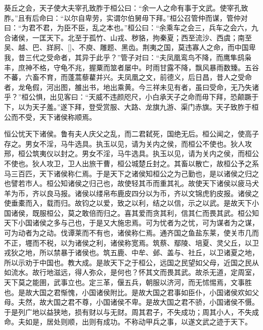 \documentclass[]{article}
\begin{document}
葵丘之会，天子使大夫宰孔致胙于桓公曰：``余一人之命有事于文武。使宰孔致胙。''且有后命曰：``以尔自卑劳，实谓尔伯舅毋下拜。''桓公召管仲而谋，管仲对曰：``为君不君，为臣不臣，乱之本也。''桓公曰：``余乘车之会三，兵车之会六，九合诸侯，一匡天下。北至于孤竹、山戎、秽貉，拘秦夏；西至流沙、西虞；南至吴、越、巴、牂牁、{[}{]}、不庾、雕题、黑齿。荆夷之国，莫违寡人之命，而中国卑我，昔三代之受命者，其异于此乎？''管子对曰：``夫凤凰鸾鸟不降，而鹰隼鸱枭丰，庶神不格，守龟不兆，握粟而筮者屡中。时雨甘露不降，飘风暴雨数臻。五谷不蕃，六畜不育，而蓬蒿藜藋并兴。夫凤凰之文，前德义，后日昌，昔人之受命者，龙龟假，河出图，雒出书，地出乘黄。今三祥未见有者，虽曰受命，无乃失诸乎？''桓公惧，出见客曰：``天威不违颜咫尺，小白承天子之命而毋下拜，恐颠蹶于下，以为天子羞。''遂下拜，登受赏服、大路、龙旗九游、渠门赤旗。天子致胙于桓公而不受，天下诸侯称顺焉。

恒公忧天下诸侯。鲁有夫人庆父之乱，而二君弑死，国绝无后。桓公闻之，使高子存之。男女不淫，马牛选具。执玉以见，请为关内之侯，而桓公不使也。狄人攻邢，桓公筑夷仪以封之。男女不淫，马牛选具。执玉以见，请为关内之侯，而桓公不使也。狄人攻卫，卫人出旅干曹，桓公城楚丘封之。其畜以散亡，故桓公予之系马三百匹，天下诸侯称仁焉。于是天下之诸侯知桓公之为己勤也，是以诸侯之归之也譬若市人。桓公知诸侯之归己也，故使轻其币而重其礼。故使天下诸侯以疲马犬羊为币，齐以良马报。诸侯以缕帛布鹿皮四分以为币，齐以文锦虎豹皮报。诸侯之使垂橐而入，载而归。故钧之以爱，致之以利，结之以信，示之以武。是故天下小国诸侯，既服桓公，莫之敢倍而归之。喜其爱而贪其利，信其仁而畏其武。桓公知天下小国诸侯之多与己也，于是又大施忠焉。可为忧者为之忧，可为谋者为之谋，可为动者为之动。伐谭莱而不有也，诸侯称仁焉。通齐国之鱼盐东莱，使关市几而不正，壥而不税，以为诸侯之利，诸侯称宽焉。筑蔡、鄢陵、培夏、灵父丘，以卫戎狄之地，所以禁暴于诸侯也。筑五鹿、中牟、邺、盖与、社丘，以卫诸夏之地，所以示劝于中国也。教大成。是故天下之于桓公，远国之民望如父母，近国之民从如流水。故行地滋远，得人弥众，是何也？怀其文而畏其武。故杀无道，定周室，天下莫之能圉，武事立也。定三革，偃五兵，朝服以济河，而无怵惕焉，文事胜也。是故大国之君惭愧，小国诸侯附比。是故大国之君事如臣仆，小国诸侯欢如父母。夫然，故大国之君不尊，小国诸侯不卑。是故大国之君不骄，小国诸侯不慑。于是列广地以益狭地，损有财以与无财。周其君子，不失成功；周其小人，不失成命。夫如是，居处则顺，出则有成功。不称动甲兵之事，以遂文武之迹于天下。
\end{document}
